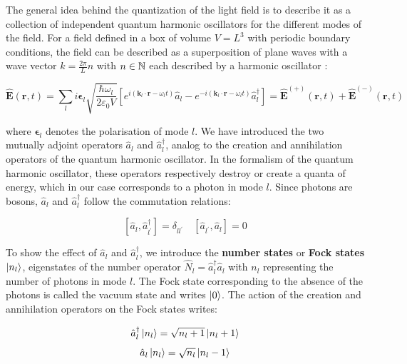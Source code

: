 The general idea behind the quantization of the light field is to describe it as a collection of independent quantum harmonic oscillators for the different modes of the field. For a field defined in a box of volume $V=L^3$ with periodic boundary conditions, the field can be described as a superposition of plane waves with a wave vector $k=\frac{2 \pi}{L} n$ with $n \in \mathbb{N}$ each described by a harmonic oscillator \cite{walls2008}:

\begin{equation}
    \hat{\bm{E}}(\bm{r}, t)=\sum_{l} i \bm{\epsilon}_{l} \sqrt{\frac{\hbar \omega_l}{2 \varepsilon_0 V}} \left[e^{i (\bm{k}_{l} \cdot \bm{r} - \omega_l t)} \hat{a}_{l}-e^{-i (\bm{k}_{l} \cdot \bm{r} - \omega_l t)} \hat{a}_{l}^{\dagger}\right]  = \hat{\bm{E}}^{(+)}(\bm{r}, t)+\hat{\bm{E}}^{(-)}(\bm{r}, t)
\end{equation}

\noindent where $\bm{\epsilon}_{l}$ denotes the polarisation of mode $l$. We have introduced the two mutually adjoint operators $\hat{a}_{l}$ and $\hat{a}_{l}^{\dagger}$, analog to the creation and annihilation operators of the quantum harmonic oscillator. In the formalism of the quantum harmonic oscillator, these operators respectively destroy or create a quanta of energy, which in our case corresponds to a photon in mode $l$. Since photons are bosons, $\hat{a}_{l}$ and $\hat{a}_{l}^{\dagger}$ follow the commutation relations:

\begin{equation}
    \left[\hat{a}_{l}, \hat{a}_{l^{\prime}}^{\dagger}\right]=\delta_{l l^{\prime}} \quad\left[\hat{a}_{l^{\prime}}, \hat{a}_{l}\right]=0
\end{equation}

To show the effect of $\hat{a}_{l}$ and $\hat{a}_{l}^{\dagger}$, we introduce the \textbf{number states} or \textbf{Fock states} $\ket{n_l}$, eigenstates of the number operator $\hat{N}_l = \hat{a}_{l}^{\dagger} \hat{a}_{l}$ with $n_l$ representing the number of photons in mode $l$. The Fock state corresponding to the absence of the photons is called the vacuum state and writes $\ket{0}$. The action of the creation and annihilation operators on the Fock states writes:



\begin{equation}
    \hat{a}_{l}^{\dagger} \ket{n_l}=\sqrt{n_l+1}\left|n_l+1\right\rangle
\end{equation}
\begin{equation}
    \hat{a}_{l} \ket{n_l}=\sqrt{n_l}\left|n_l-1\right\rangle
\end{equation}

